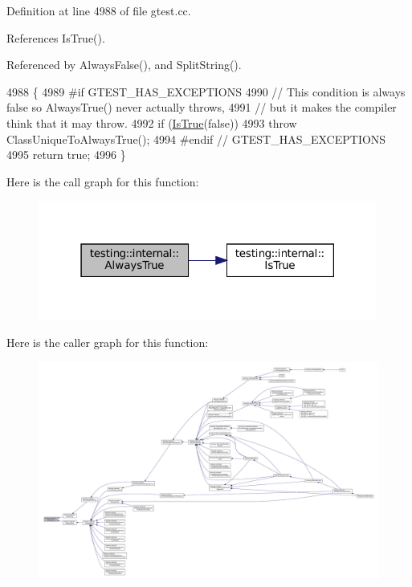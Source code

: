 Definition at line 4988 of file gtest.\+cc.



References Is\+True().



Referenced by Always\+False(), and Split\+String().


\begin{DoxyCode}
4988                   \{
4989 \textcolor{preprocessor}{#if GTEST\_HAS\_EXCEPTIONS}
4990   \textcolor{comment}{// This condition is always false so AlwaysTrue() never actually throws,}
4991   \textcolor{comment}{// but it makes the compiler think that it may throw.}
4992   \textcolor{keywordflow}{if} (\hyperlink{namespacetesting_1_1internal_a527b9bcc13669b9a16400c8514266254}{IsTrue}(\textcolor{keyword}{false}))
4993     \textcolor{keywordflow}{throw} ClassUniqueToAlwaysTrue();
4994 \textcolor{preprocessor}{#endif  // GTEST\_HAS\_EXCEPTIONS}
4995   \textcolor{keywordflow}{return} \textcolor{keyword}{true};
4996 \}
\end{DoxyCode}
Here is the call graph for this function\+:
\nopagebreak
\begin{figure}[H]
\begin{center}
\leavevmode
\includegraphics[width=316pt]{namespacetesting_1_1internal_a922c9da63cd4bf94fc473b9ecac76414_cgraph}
\end{center}
\end{figure}
Here is the caller graph for this function\+:
\nopagebreak
\begin{figure}[H]
\begin{center}
\leavevmode
\includegraphics[width=350pt]{namespacetesting_1_1internal_a922c9da63cd4bf94fc473b9ecac76414_icgraph}
\end{center}
\end{figure}
\mbox{\label{namespacetesting_1_1internal_ae475a090bca903bb222dd389eb189166}} 
